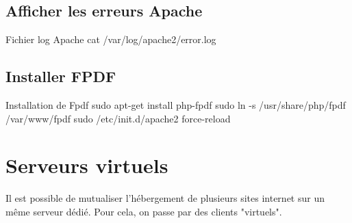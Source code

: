\section{Afficher les erreurs Apache}
\begin{Bash}{Fichier log Apache}
cat /var/log/apache2/error.log 
\end{Bash}


\section{Installer FPDF}

\begin{Bash}{Installation de Fpdf}
sudo apt-get install php-fpdf
sudo ln -s /usr/share/php/fpdf /var/www/fpdf
sudo /etc/init.d/apache2 force-reload
\end{Bash}




\chapter{Serveurs virtuels}

Il est possible de mutualiser l'hébergement de plusieurs sites internet sur un même serveur dédié.
Pour cela, on passe par des clients "virtuels".


